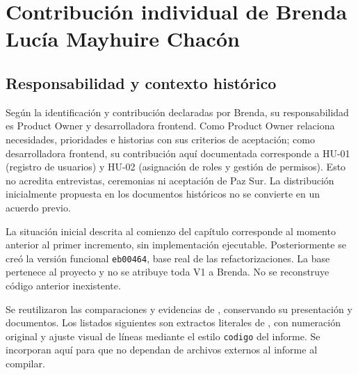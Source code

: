 \section{Contribución individual de Brenda Lucía Mayhuire Chacón}
\label{sec:brenda-refactorizacion}
\subsection{Responsabilidad y contexto histórico}
Según la identificación y contribución declaradas por Brenda, su responsabilidad es Product Owner y desarrolladora frontend. Como Product Owner relaciona necesidades, prioridades e historias con sus criterios de aceptación; como desarrolladora frontend, su contribución aquí documentada corresponde a HU-01 (registro de usuarios) y HU-02 (asignación de roles y gestión de permisos). Esto no acredita entrevistas, ceremonias ni aceptación de Paz Sur. La distribución inicialmente propuesta en los documentos históricos no se convierte en un acuerdo previo.

La situación inicial descrita al comienzo del capítulo corresponde al momento anterior al primer incremento, sin implementación ejecutable. Posteriormente se creó la versión funcional \texttt{eb00464}, base real de las refactorizaciones. La base pertenece al proyecto y no se atribuye toda V1 a Brenda. No se reconstruye código anterior inexistente.

Se reutilizaron las comparaciones y evidencias de , conservando su presentación y documentos. Los listados siguientes son extractos literales de , con numeración original y ajuste visual de líneas mediante el estilo \texttt{codigo} del informe. Se incorporan aquí para que no dependan de archivos externos al informe al compilar.

